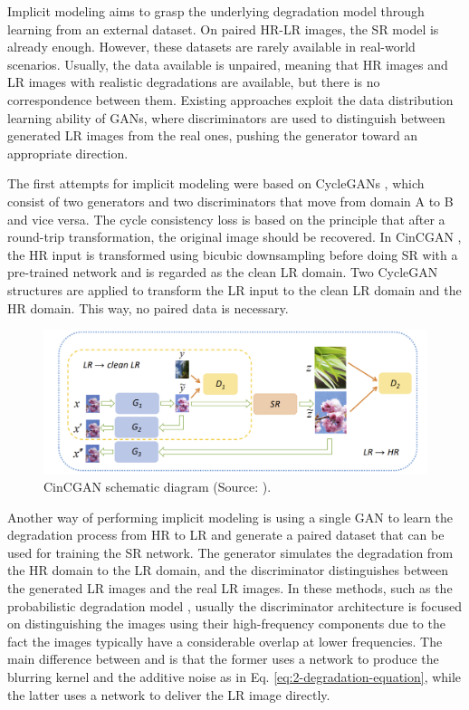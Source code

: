         Implicit modeling aims to grasp the underlying degradation model through learning from an external dataset.
        On paired HR-LR images, the SR model is already enough. However, these datasets are rarely available in real-world scenarios.
        Usually, the data available is unpaired, meaning that HR images and LR images with realistic degradations are available, but there is no correspondence between them.
        Existing approaches exploit the data distribution learning ability of GANs, where discriminators are used to distinguish between generated LR images from the real ones, pushing the generator toward an appropriate direction.
        
        The first attempts for implicit modeling were based on CycleGANs \cite{CycleGAN2017}, which consist of two generators and two discriminators that move from domain A to B and vice versa. 
        The cycle consistency loss is based on the principle that after a round-trip transformation, the original image should be recovered.
        In CinCGAN \cite{yuan2018unsupervised}, the HR input is transformed using bicubic downsampling before doing SR with a pre-trained network and is regarded as the clean LR domain.
        Two CycleGAN structures are applied to transform the LR input to the clean LR domain and the HR domain. 
        This way, no paired data is necessary.

        \begin{figure}[H]
            \centering
            \includegraphics[width=\textwidth]{Includes/4-ccingan.png}
            \caption{CinCGAN schematic diagram (Source: \cite{yuan2018unsupervised}).}    
            \label{fig:2-CinCGAN}
        \end{figure}

        Another way of performing implicit modeling is using a single GAN to learn the degradation process from HR to LR and generate a  paired dataset that can be used for training the SR network.
        The generator simulates the degradation from the HR domain to the LR domain, and the discriminator distinguishes between the generated LR images and the real LR images.
        In these methods, such as the probabilistic degradation model \cite{luo2022learning,bulat2018learn}, usually the discriminator architecture is focused on distinguishing the images using their high-frequency components due to the fact the images typically have a considerable overlap at lower frequencies. The main difference between \cite{luo2022learning} and \cite{bulat2018learn} is that the former uses a network to produce the blurring kernel and the additive noise as in Eq. \ref{eq:2-degradation-equation}, while the latter uses a network to deliver the LR image directly.
        
